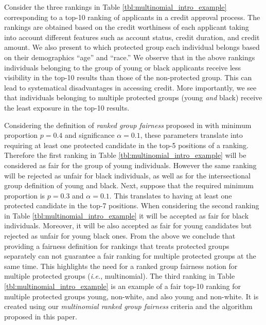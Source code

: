 \begin{example} Consider the three rankings in Table \ref{tbl:multinomial_intro_example} corresponding to a top-10 ranking of applicants in a credit approval process. The rankings are obtained based on the credit worthiness of each applicant taking into account different features such as account status, credit duration, and credit amount.
%
We also present to which protected group each individual belongs based on their demographics ``age'' and ``race.'' We observe that in the above rankings individuals belonging to the group of young or black applicants receive less visibility in the top-10 results than those of the non-protected group. This can lead to systematical disadvantages in accessing credit. 
More importantly, we see that individuals belonging to multiple protected groups (young \emph{and } black) receive the least exposure in the top-10 results.

	Considering the definition of \textit{ranked group fairness} proposed in \cite{zehlike2017fair} with minimum proportion $p=0.4$ and significance $\alpha=0.1$, these parameters translate into requiring at least one protected candidate in the top-5 positions of a ranking.
	Therefore the first ranking in Table \ref{tbl:multinomial_intro_example} will be considered as fair for the group of young individuals.
	However the same ranking will be rejected as unfair for black individuals, as well as for the intersectional group definition of young and black.
	Next, suppose that the required minimum proportion is $p = 0.3$ and $\alpha = 0.1$. This translates to having at least one protected candidate in the top-7 positions.
	When considering the second ranking in Table \ref{tbl:multinomial_intro_example} it will be accepted as fair for black individuals. Moreover, it will be also accepted as fair for young candidates but rejected as unfair for young black ones.
	From the above we conclude that providing a fairness definition for rankings that treats protected groups separately can not guarantee a fair ranking for multiple protected groups at the same time. This highlights the need for a ranked group fairness notion for multiple protected groups ({\em i.e.}, multinomial).
	The third ranking in Table \ref{tbl:multinomial_intro_example} is an example of a fair top-10 ranking for multiple protected groups young, non-white, and also young and non-white. It is created using our \textit{multinomial ranked group fairness} criteria and the algorithm proposed in this paper.
\end{example}


